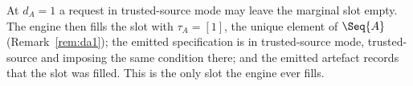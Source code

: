
\begin{requirement}\label{req:marginal-fill}
At $d_A=1$ a request in trusted-source mode may leave the marginal slot
empty. The engine then fills the slot with $\tau_A=[1]$, the unique element
of $\Seq{A}$ (Remark~\ref{rem:da1}); the emitted specification is in
trusted-source mode, trusted-source and  imposing the
same condition there; and the emitted artefact records that the slot was
filled. This is the only slot the engine ever fills.
\end{requirement}
